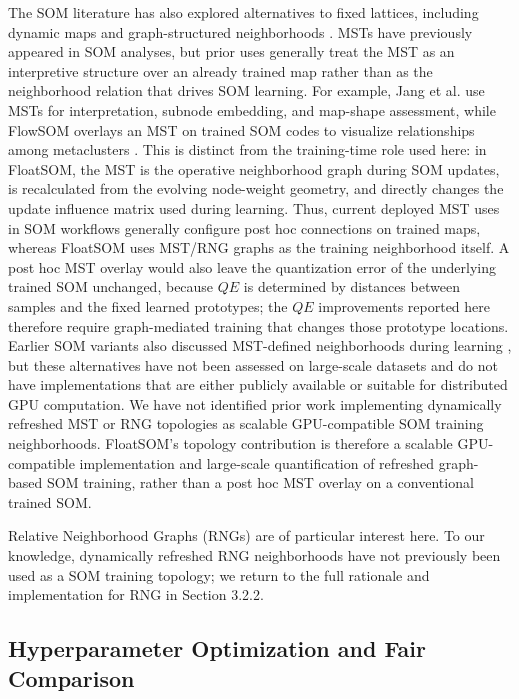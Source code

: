 \documentclass[11pt]{article}
\begin{document}
The SOM literature has also explored alternatives to fixed lattices, including dynamic maps and graph-structured neighborhoods \citep{vasighiDirectedBatchGrowing2017,spanakisAMSOMAdaptiveMoving2016,kangasVariantsSelforganizingMaps1990,jangUseMinimalSpanning2009}. MSTs have previously appeared in SOM analyses, but prior uses generally treat the MST as an interpretive structure over an already trained map rather than as the neighborhood relation that drives SOM learning. For example, Jang et al. use MSTs for interpretation, subnode embedding, and map-shape assessment, while FlowSOM overlays an MST on trained SOM codes to visualize relationships among metaclusters \citep{jangUseMinimalSpanning2009,vangassenFlowSOMUsingSelforganizing2015}. This is distinct from the training-time role used here: in FloatSOM, the MST is the operative neighborhood graph during SOM updates, is recalculated from the evolving node-weight geometry, and directly changes the update influence matrix used during learning. Thus, current deployed MST uses in SOM workflows generally configure post hoc connections on trained maps, whereas FloatSOM uses MST/RNG graphs as the training neighborhood itself. A post hoc MST overlay would also leave the quantization error of the underlying trained SOM unchanged, because $QE$ is determined by distances between samples and the fixed learned prototypes; the $QE$ improvements reported here therefore require graph-mediated training that changes those prototype locations. Earlier SOM variants also discussed MST-defined neighborhoods during learning \citep{kangasVariantsSelforganizingMaps1990}, but these alternatives have not been assessed on large-scale datasets and do not have implementations that are either publicly available or suitable for distributed GPU computation. We have not identified prior work implementing dynamically refreshed MST or RNG topologies as scalable GPU-compatible SOM training neighborhoods. FloatSOM's topology contribution is therefore a scalable GPU-compatible implementation and large-scale quantification of refreshed graph-based SOM training, rather than a post hoc MST overlay on a conventional trained SOM.

Relative Neighborhood Graphs (RNGs) \citep{toussaintRelativeNeighbourhoodGraph1980} are of particular interest here. To our knowledge, dynamically refreshed RNG neighborhoods have not previously been used as a SOM training topology; we return to the full rationale and implementation for RNG in Section 3.2.2.

\subsection{Hyperparameter Optimization and Fair Comparison}
\end{document}
